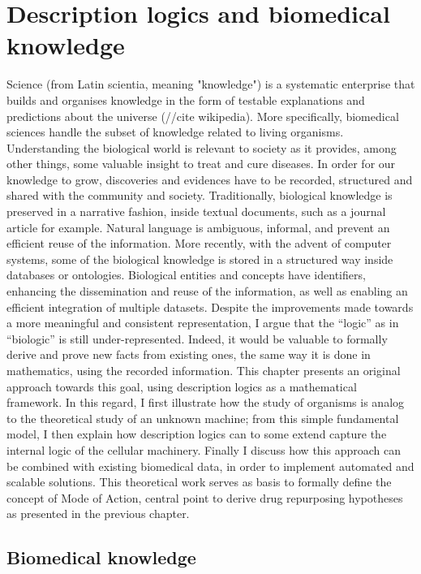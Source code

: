 \chapter{Description logics and biomedical knowledge }

Science (from Latin scientia, meaning "knowledge") is a systematic enterprise that builds and organises knowledge in the form of testable explanations and predictions about the universe (//cite wikipedia). More specifically, biomedical sciences handle the subset of knowledge related to living organisms. Understanding the biological world is relevant to society as it provides, among other things, some valuable insight to treat and cure diseases. In order for our knowledge to grow, discoveries and evidences have to be recorded, structured and shared with the community and society. Traditionally, biological knowledge is preserved in a narrative fashion, inside textual documents, such as a journal article for example. Natural language is ambiguous, informal, and prevent an efficient reuse of the information. More recently, with the advent of computer systems, some of the biological knowledge is stored in a structured way inside databases or ontologies. Biological entities and concepts have identifiers, enhancing the dissemination and reuse of the information, as well as enabling an efficient integration of multiple datasets. Despite the improvements made towards a more meaningful and consistent representation, I argue that the “logic” as in “biologic” is still under-represented. Indeed, it would be valuable to formally derive and prove new facts from existing ones, the same way it is done in mathematics, using the recorded information. This chapter presents an original approach towards this goal, using description logics as a mathematical framework. In this regard, I first illustrate how the study of organisms is analog to the theoretical study of an unknown machine; from this simple fundamental model, I then explain how description logics can to some extend capture the internal logic of the cellular machinery. Finally I discuss how this approach can be combined with existing biomedical data, in order to implement automated and scalable solutions. This theoretical work serves as basis to formally define the concept of Mode of Action, central point to derive drug repurposing hypotheses as presented in the previous chapter.

\section{Biomedical knowledge}

